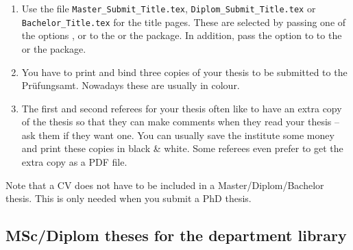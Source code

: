 \begin{enumerate}
\item Use the file \texttt{Master\_Submit\_Title.tex},
  \texttt{Diplom\_Submit\_Title.tex} or\\
  \texttt{Bachelor\_Title.tex} for the title pages.
  These are selected by passing one of the options
  ,  or 
  to the  or the  package.
  In addition, pass the option  to 
  to the  or the  package.
\item You have to print and bind three copies of your thesis
  to be submitted to the
  \foreignlanguage{ngerman}{Prüfungsamt}. Nowadays these are usually in
  colour.
\item The first and second referees for your thesis often like to
  have an extra copy of the thesis so that they can make comments when they read
  your thesis -- ask them if they want one. You can usually save the
  institute some money and print these copies in black \& white.
  Some referees even prefer to get the extra copy as a PDF file.
\end{enumerate}

Note that a CV does not have to be included in a Master/Diplom/Bachelor
thesis. This is only needed when you submit a PhD thesis.


\subsection{MSc/Diplom theses for the department library}

